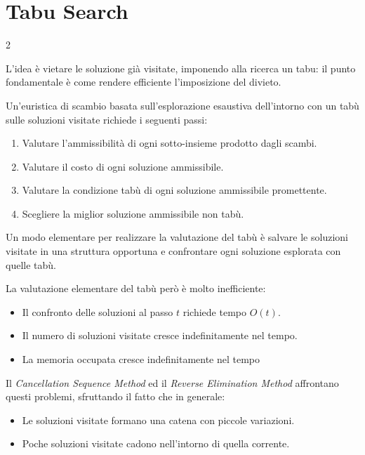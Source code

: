 \documentclass[\main/main.tex]{subfiles}
\begin{document}
\clearpage
\section{Tabu Search}
\begin{multicols}{2}
\begin{observation}
    L'idea è vietare le soluzione già visitate, imponendo alla ricerca un tabu: il punto fondamentale è come rendere efficiente l'imposizione del divieto.
\end{observation}
\begin{definition}
    Un'euristica di scambio basata sull'esplorazione esaustiva dell'intorno con un tabù sulle soluzioni visitate richiede i seguenti passi:
    \begin{enumerate}
        \item Valutare l'ammissibilità di ogni sotto-insieme prodotto dagli scambi.
        \item Valutare il costo di ogni soluzione ammissibile.
        \item Valutare la condizione tabù di ogni soluzione ammissibile promettente.
        \item Scegliere la miglior soluzione ammissibile non tabù.
    \end{enumerate}
\end{definition}
\begin{definition}
    Un modo elementare per realizzare la valutazione del tabù è salvare le soluzioni visitate in una struttura opportuna e confrontare ogni soluzione esplorata con quelle tabù.
\end{definition}
\begin{observation}
    La valutazione elementare del tabù però è molto inefficiente:
    \begin{itemize}
        \item Il confronto delle soluzioni al passo \(t\) richiede tempo \(O(t)\).
        \item Il numero di soluzioni visitate cresce indefinitamente nel tempo.
        \item La memoria occupata cresce indefinitamente nel tempo
    \end{itemize}
\end{observation}
\begin{observation}
    Il \textit{Cancellation Sequence Method} ed il \textit{Reverse Elimination Method} affrontano questi problemi, sfruttando il fatto che in generale:
    \begin{itemize}
        \item Le soluzioni visitate formano una catena con piccole variazioni.
        \item Poche soluzioni visitate cadono nell'intorno di quella corrente.
    \end{itemize}
    

\end{observation}
\end{multicols}
\end{document}
